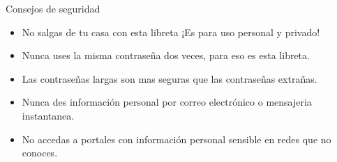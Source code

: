 \documentclass{article}
\newcommand{\cmark}{\ding{51}}%
\newcommand{\xmark}{\ding{55}}%
\begin{document}
\linespread{1.6}

\selectfont


\color{gris}



\begin{center}
	\begin{minipage}{0.48\textwidth}
		{\LARGE Consejos de seguridad}
		\begin{itemize}
			\item[\xmark] No salgas de tu casa con esta libreta ¡Es para uso personal y privado!
			\item[\xmark] Nunca uses la misma contraseña dos veces, para eso es esta libreta.
			\item[\cmark] Las contraseñas largas son mas seguras que las contraseñas extrañas.
			\item[\xmark] Nunca des información personal por correo electrónico o mensajeria instantanea.
			\item[\xmark] No accedas a portales con información personal sensible en redes que no conoces. 
		\end{itemize}
	\end{minipage} \hspace{0.5cm}
	\begin{minipage}{0.48\textwidth}
		\hspace{3cm}
	\end{minipage}
\end{center}
\end{document}
